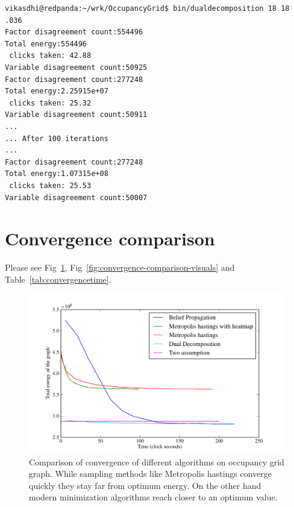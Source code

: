 \documentclass[10pt,oneside,letterpaper]{article}
\begin{document}
\begin{lstlisting}
vikasdhi@redpanda:~/wrk/OccupancyGrid$ bin/dualdecomposition 18 18 .036
Factor disagreement count:554496
Total energy:554496
 clicks taken: 42.88
Variable disagreement count:50925
Factor disagreement count:277248
Total energy:2.25915e+07
 clicks taken: 25.32
Variable disagreement count:50911
...
... After 100 iterations
...
Factor disagreement count:277248
Total energy:1.07315e+08
 clicks taken: 25.53
Variable disagreement count:50007
\end{lstlisting}

\section{Convergence comparison}
Please see Fig~\ref{fig:convergence-comparison}, Fig~\ref{fig:convergence-comparison-visuals} and Table~\ref{tab:convergencetime}.
\begin{figure}
  \includegraphics[width=\textwidth]{figures/relativeconvergence.pdf}%
  \caption{Comparison of convergence of different algorithms on occupancy grid graph. While sampling methods like Metropolis hastings converge quickly they stay far from optimum energy. On the other hand modern minimization algorithms reach closer to an optimum value.}
  \label{fig:convergence-comparison}
\end{figure}
\end{document}
